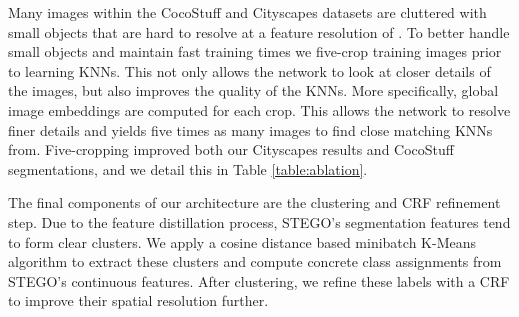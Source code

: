 \documentclass{article} \usepackage{iclr2022_conference,times}
\begin{document}
Many images within the CocoStuff and Cityscapes datasets are cluttered with small objects that are hard to resolve at a feature resolution of . To better handle small objects and maintain fast training times we five-crop training images prior to learning KNNs. This not only allows the network to look at closer details of the images, but also improves the quality of the KNNs. More specifically, global image embeddings are computed for each crop. This allows the network to resolve finer details and yields five times as many images to find close matching KNNs from. Five-cropping improved both our Cityscapes results and CocoStuff segmentations, and we detail this in Table \ref{table:ablation}. 

The final components of our architecture are the clustering and CRF refinement step. Due to the feature distillation process, STEGO's segmentation features tend to form clear clusters. We apply a cosine distance based minibatch K-Means algorithm \citep{kmeans} to extract these clusters and compute concrete class assignments from STEGO's continuous features. After clustering, we refine these labels with a CRF to improve their spatial resolution further. 
\end{document}
